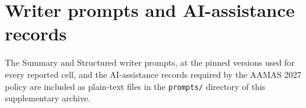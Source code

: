 \section{Writer prompts and AI-assistance records}
\label{sec:prompts}
The Summary and Structured writer prompts, at the pinned versions used for
every reported cell, and the AI-assistance records required by the AAMAS 2027
policy are included as plain-text files in the \texttt{prompts/} directory of
this supplementary archive.
